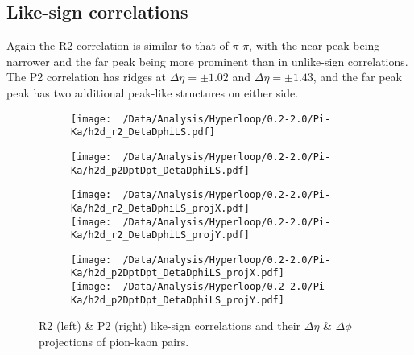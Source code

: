 \documentclass[12pt,a4paper,twoside]{report}
\begin{document}
\subsection{Like-sign correlations}
Again the R2 correlation is similar to that of $\pi$-$\pi$, with the near peak being narrower and the far peak being more prominent than in unlike-sign correlations. The P2 correlation has ridges at $\Delta\eta=\pm1.02$ and $\Delta\eta=\pm1.43$, and the far peak peak has two additional peak-like structures on either side.
\begin{figure}[H]
	\begin{subfigure}{0.49\linewidth}
		\texttt{[image: ~/Data/Analysis/Hyperloop/0.2-2.0/Pi-Ka/h2d\_r2\_DetaDphiLS.pdf]}\\
	\end{subfigure}
	\begin{subfigure}{0.49\linewidth}
		\texttt{[image: ~/Data/Analysis/Hyperloop/0.2-2.0/Pi-Ka/h2d\_p2DptDpt\_DetaDphiLS.pdf]}\\
	\end{subfigure}
\end{figure}
\begin{figure}[H]
	\ContinuedFloat
	\begin{subfigure}{0.49\linewidth}
		\texttt{[image: ~/Data/Analysis/Hyperloop/0.2-2.0/Pi-Ka/h2d\_r2\_DetaDphiLS\_projX.pdf]}\\
		\texttt{[image: ~/Data/Analysis/Hyperloop/0.2-2.0/Pi-Ka/h2d\_r2\_DetaDphiLS\_projY.pdf]}\\
	\end{subfigure}
	\begin{subfigure}{0.49\linewidth}
		\texttt{[image: ~/Data/Analysis/Hyperloop/0.2-2.0/Pi-Ka/h2d\_p2DptDpt\_DetaDphiLS\_projX.pdf]}\\
		\texttt{[image: ~/Data/Analysis/Hyperloop/0.2-2.0/Pi-Ka/h2d\_p2DptDpt\_DetaDphiLS\_projY.pdf]}\\
	\end{subfigure}
	\caption{R2 (left) \& P2 (right) like-sign correlations and their $\Delta\eta$ \& $\Delta\phi$ projections of pion-kaon pairs.}
\end{figure}
\end{document}
